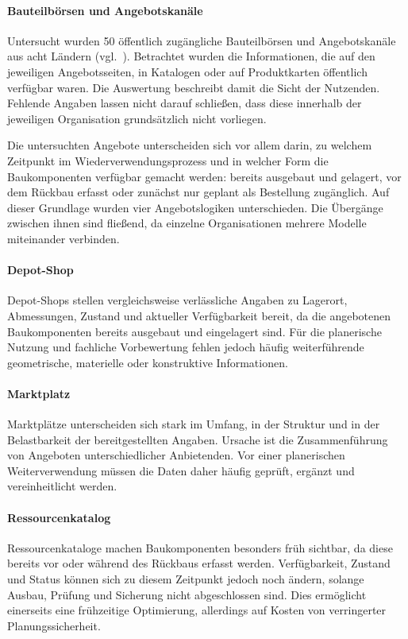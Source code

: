 \documentclass[type=zwischenbericht]{zukunftbau}
\begin{document}
\begin{SemioNest}
\paragraph{Bauteilbörsen und Angebotskanäle}
Untersucht wurden 50 öffentlich zugängliche Bauteilbörsen und Angebotskanäle aus acht Ländern (vgl.\ ). Betrachtet wurden die Informationen, die auf den jeweiligen Angebotsseiten, in Katalogen oder auf Produktkarten öffentlich verfügbar waren. Die Auswertung beschreibt damit die Sicht der Nutzenden. Fehlende Angaben lassen nicht darauf schließen, dass diese innerhalb der jeweiligen Organisation grundsätzlich nicht vorliegen.

Die untersuchten Angebote unterscheiden sich vor allem darin, zu welchem Zeitpunkt im Wiederverwendungsprozess und in welcher Form die Baukomponenten verfügbar gemacht werden: bereits ausgebaut und gelagert, vor dem Rückbau erfasst oder zunächst nur geplant als Bestellung zugänglich. Auf dieser Grundlage wurden vier Angebotslogiken unterschieden. Die Übergänge zwischen ihnen sind fließend, da einzelne Organisationen mehrere Modelle miteinander verbinden.

\begin{SemioNest}
\paragraph{Depot-Shop}
Depot-Shops stellen vergleichsweise verlässliche Angaben zu Lagerort, Abmessungen, Zustand und aktueller Verfügbarkeit bereit, da die angebotenen Baukomponenten bereits ausgebaut und eingelagert sind. Für die planerische Nutzung und fachliche \Gls{Vorbewertung} fehlen jedoch häufig weiterführende geometrische, materielle oder konstruktive Informationen.
  
\paragraph{Marktplatz}
Marktplätze unterscheiden sich stark im Umfang, in der Struktur und in der Belastbarkeit der bereitgestellten Angaben. Ursache ist die Zusammenführung von Angeboten unterschiedlicher Anbietenden. Vor einer planerischen Weiterverwendung müssen die Daten daher häufig geprüft, ergänzt und vereinheitlicht werden.
  
\paragraph{Ressourcenkatalog}
Ressourcenkataloge machen Baukomponenten besonders früh sichtbar, da diese bereits vor oder während des Rückbaus erfasst werden. Verfügbarkeit, Zustand und Status können sich zu diesem Zeitpunkt jedoch noch ändern, solange Ausbau, Prüfung und Sicherung nicht abgeschlossen sind. Dies ermöglicht einerseits eine frühzeitige Optimierung, allerdings auf Kosten von verringerter Planungssicherheit.
  

\end{SemioNest}
\end{SemioNest}
\end{document}

